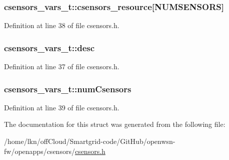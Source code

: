 \subsubsection[{\texorpdfstring{csensors\+\_\+resource}{csensors_resource}}]{ csensors\+\_\+vars\+\_\+t\+::csensors\+\_\+resource\mbox{[}{\bf N\+U\+M\+S\+E\+N\+S\+O\+RS}\mbox{]}}\hypertarget{structcsensors__vars__t_ab3ef42b0b7249d8cb1b808e32224798d}{}\label{structcsensors__vars__t_ab3ef42b0b7249d8cb1b808e32224798d}


Definition at line 38 of file csensors.\+h.

\subsubsection[{\texorpdfstring{desc}{desc}}]{ csensors\+\_\+vars\+\_\+t\+::desc}\hypertarget{structcsensors__vars__t_a7dbe71d9880e474d0a8525b4af4d7fe4}{}\label{structcsensors__vars__t_a7dbe71d9880e474d0a8525b4af4d7fe4}


Definition at line 37 of file csensors.\+h.

\subsubsection[{\texorpdfstring{num\+Csensors}{numCsensors}}]{ csensors\+\_\+vars\+\_\+t\+::num\+Csensors}\hypertarget{structcsensors__vars__t_a33e2d4aab034c26735676e54f7ffe7cc}{}\label{structcsensors__vars__t_a33e2d4aab034c26735676e54f7ffe7cc}


Definition at line 39 of file csensors.\+h.



The documentation for this struct was generated from the following file\+:\begin{DoxyCompactItemize}
\item 
/home/lkn/off\+Cloud/\+Smartgrid-\/code/\+Git\+Hub/openwsn-\/fw/openapps/csensors/\hyperlink{csensors_8h}{csensors.\+h}\end{DoxyCompactItemize}

